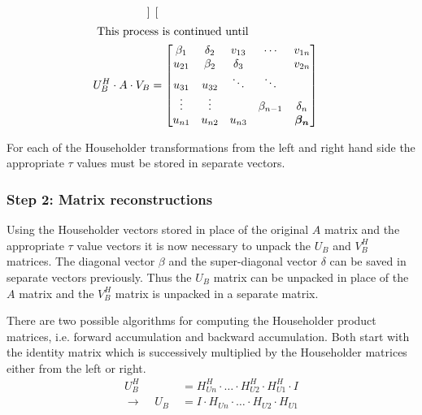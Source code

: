 \begin{align}
\begin{bmatrix}
\end{bmatrix}\\
\intertext{
This process is continued until
}
U_B^H \cdot A \cdot V_B &=
\begin{bmatrix}
\beta_1 & \delta_2 & v_{13} & \cdots & v_{1n} \\
u_{21} & \beta_2 & \delta_3 &  & v_{2n} \\
u_{31} & u_{32} & \ddots & \ddots &  \\
\vdots & \vdots & & \beta_{n-1} & \delta_n \\
u_{n1} & u_{n2} & u_{n3} &  & \boldsymbol{\beta_n} \\
\end{bmatrix}
\end{align}

For each of the Householder transformations from the left and right
hand side the appropriate $\tau$ values must be stored in separate
vectors.

\subsubsection{Step 2: Matrix reconstructions}

Using the Householder vectors stored in place of the original $A$
matrix and the appropriate $\tau$ value vectors it is now necessary to
unpack the $U_B$ and $V_B^H$ matrices.  The diagonal vector $\beta$
and the super-diagonal vector $\delta$ can be saved in separate
vectors previously.  Thus the $U_B$ matrix can be unpacked in place of
the $A$ matrix and the $V_B^H$ matrix is unpacked in a separate
matrix.

\addvspace{12pt}

There are two possible algorithms for computing the Householder
product matrices, i.e. forward accumulation and backward accumulation.
Both start with the identity matrix which is successively multiplied
by the Householder matrices either from the left or right.
\begin{align}
U_B^H &= H^H_{Un}\cdot \ldots \cdot H^H_{U2}\cdot H^H_{U1}\cdot I\\
\rightarrow\;\;\;\; U_B\; &= I\cdot H_{Un}\cdot \ldots \cdot H_{U2}\cdot H_{U1}
\end{align}

